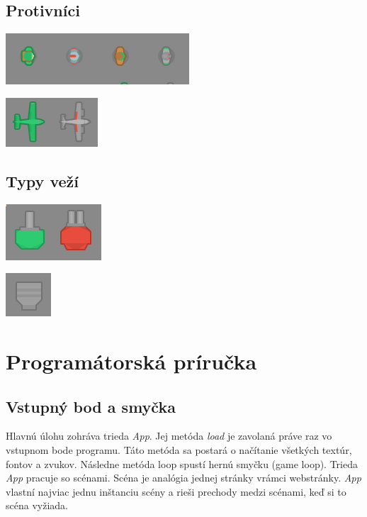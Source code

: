 \documentclass[12pt]{article}
\begin{document}
\subsection{Protivníci}

\includegraphics{images/oponenti.png}

\includegraphics{images/lietadlo.png}

\subsection{Typy veží}

\includegraphics{images/veze.png}

\includegraphics{images/raketomet.png}

\section{Programátorská príručka}

\subsection{Vstupný bod a smyčka}
Hlavnú úlohu zohráva trieda \emph{App}. Jej metóda \emph{load} je zavolaná práve raz vo vstupnom
bode programu. Táto metóda sa postará o načítanie všetkých textúr, fontov a zvukov.
Následne metóda loop spustí hernú smyčku (game loop). Trieda \emph{App} pracuje so scénami.
Scéna je analógia jednej stránky vrámci webstránky. \emph{App} vlastní najviac jednu inštanciu
scény a rieši prechody medzi scénami, keď si to scéna vyžiada.
\end{document}

